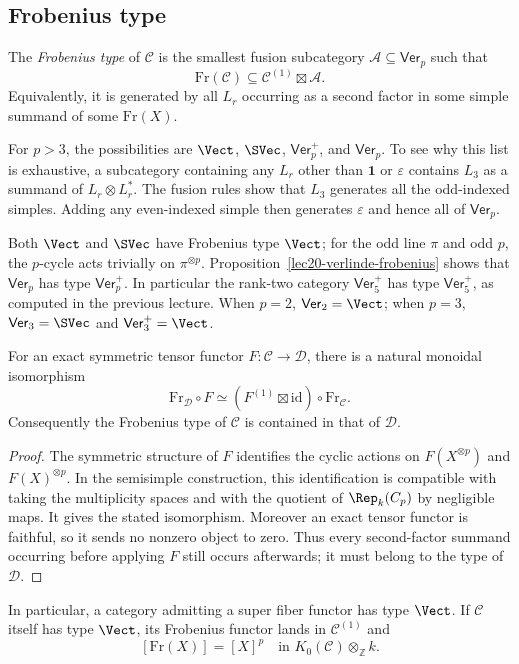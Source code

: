 \subsection{Frobenius type}
\begin{definition}
The \emph{Frobenius type} of $\mathcal C$ is the smallest fusion subcategory
$\mathcal A\subseteq\mathsf{Ver}_p$ such that
\[
 \mathrm{Fr}(\mathcal C)\subseteq\mathcal C^{(1)}\boxtimes\mathcal A.
\]
Equivalently, it is generated by all $L_r$ occurring as a second factor in
some simple summand of some $\mathrm{Fr}(X)$.
\end{definition}
For $p>3$, the possibilities are
$\Vect$, $\SVec$, $\mathsf{Ver}_p^+$, and $\mathsf{Ver}_p$.
To see why this list is exhaustive, a subcategory containing any
$L_r$ other than $\mathbf1$ or $\varepsilon$ contains $L_3$ as a summand of
$L_r\otimes L_r^*$. The fusion rules show that $L_3$ generates all the
odd-indexed simples. Adding any even-indexed simple then generates
$\varepsilon$ and hence all of $\mathsf{Ver}_p$.

\begin{example}
Both $\Vect$ and $\SVec$ have Frobenius type $\Vect$; for the odd line
$\pi$ and odd $p$, the $p$-cycle acts trivially on $\pi^{\otimes p}$.
Proposition~\ref{lec20-verlinde-frobenius} shows that
$\mathsf{Ver}_p$ has type $\mathsf{Ver}_p^+$. In particular the rank-two
category $\mathsf{Ver}_5^+$ has type $\mathsf{Ver}_5^+$, as computed in the
previous lecture. When $p=2$, $\mathsf{Ver}_2=\Vect$; when $p=3$,
$\mathsf{Ver}_3=\SVec$ and $\mathsf{Ver}_3^+=\Vect$.
\end{example}

\begin{proposition}\label{lec20-frobenius-naturality}
For an exact symmetric tensor functor $F:\mathcal C\to\mathcal D$, there
is a natural monoidal isomorphism
\[
 \mathrm{Fr}_{\mathcal D}\circ F
 \simeq(F^{(1)}\boxtimes\mathrm{id})\circ\mathrm{Fr}_{\mathcal C}.
\]
Consequently the Frobenius type of $\mathcal C$ is contained in that of
$\mathcal D$.
\end{proposition}
\begin{proof}
The symmetric structure of $F$ identifies the cyclic actions on
$F(X^{\otimes p})$ and $F(X)^{\otimes p}$. In the semisimple construction,
this identification is compatible with taking the multiplicity spaces and
with the quotient of $\Rep_k(C_p)$ by negligible maps. It gives the stated
isomorphism. Moreover an exact tensor functor is faithful, so it sends no
nonzero object to zero. Thus every second-factor summand occurring before
applying $F$ still occurs afterwards; it must belong to the type of
$\mathcal D$.
\end{proof}
In particular, a category admitting a super fiber functor has type
$\Vect$. If $\mathcal C$ itself has type $\Vect$, its Frobenius functor
lands in $\mathcal C^{(1)}$ and
\begin{equation}\label{lec20-type-vec-power}
 [\mathrm{Fr}(X)]=[X]^p
 \quad\text{in }K_0(\mathcal C)\otimes_{\mathbb Z}k.
\end{equation}

